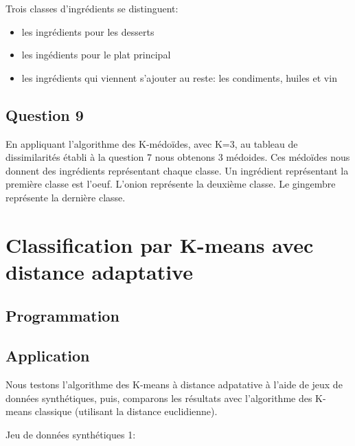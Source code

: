 \documentclass[a4paper,11pt,oneside,roman]{article}
\begin{document}
    Trois classes d'ingrédients se distinguent:
    \begin{itemize}
        \item les ingrédients pour les desserts
        \item les ingédients pour le plat principal
        \item les ingrédients qui viennent s'ajouter au reste: les condiments, huiles et vin
    \end{itemize}

    \subsection*{Question 9}

    En appliquant l'algorithme des K-médoïdes, avec K=3, au tableau de dissimilarités établi à la question 7 nous obtenons 3 médoides.
    Ces médoïdes nous donnent des ingrédients représentant chaque classe.
    Un ingrédient représentant la première classe est l'oeuf.
    L'onion représente la deuxième classe. Le gingembre représente la dernière classe.

    \section{Classification par K-means avec distance adaptative}
    \subsection{Programmation}

    \subsection{Application}
    Nous testons l'algorithme des K-means à distance adpatative à l'aide de jeux de données synthétiques, puis, comparons les résultats avec l'algorithme des K-means classique (utilisant la distance euclidienne).

    Jeu de données synthétiques 1:
\end{document}

